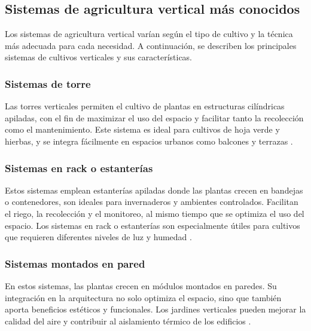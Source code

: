 
\subsection{Sistemas de agricultura vertical más conocidos}
Los sistemas de agricultura vertical varían según el tipo de cultivo y la técnica más adecuada para cada necesidad.
A continuación, se describen los principales sistemas de cultivos verticales y sus características.

\subsubsection{Sistemas de torre}
Las torres verticales permiten el cultivo de plantas en estructuras cilíndricas apiladas, con el fin de maximizar el uso del espacio y facilitar tanto la recolección como el mantenimiento. Este sistema es ideal para cultivos de hoja verde y hierbas, y se integra fácilmente en espacios urbanos como balcones y terrazas \cite{CULTIVOS:TIPOS}.

\subsubsection{Sistemas en rack o estanterías}
Estos sistemas emplean estanterías apiladas donde las plantas crecen en bandejas o contenedores, son ideales para invernaderos y ambientes controlados. Facilitan el riego, la recolección y el monitoreo, al mismo tiempo que se optimiza el uso del espacio.
Los sistemas en rack o estanterías son especialmente útiles para cultivos que requieren diferentes niveles de luz y humedad \cite{CULTIVOS:TIPOS}.

\subsubsection{Sistemas montados en pared}
En estos sistemas, las plantas crecen en módulos montados en paredes. Su integración en la arquitectura no solo optimiza el espacio, sino que también aporta beneficios estéticos y funcionales.
Los jardines verticales pueden mejorar la calidad del aire y contribuir al aislamiento térmico de los edificios \cite{CULTIVOS:TIPOS}.

